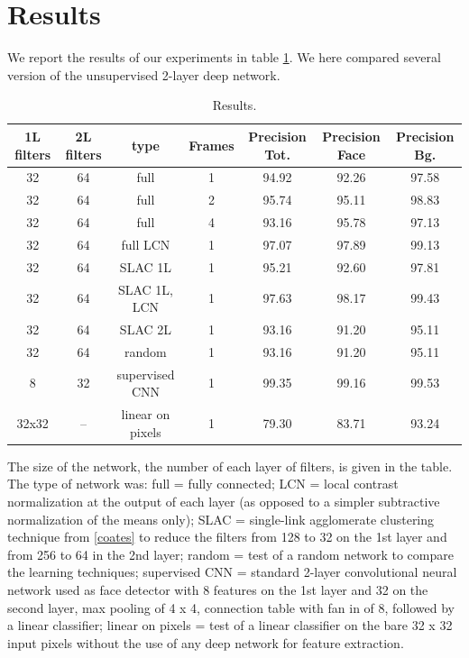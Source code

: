 \documentclass{article} %
\begin{document}



\section{Results}
\label{sec-results}


We report the results of our experiments in table \ref{table1}. We here compared several version of the unsupervised 2-layer deep network. 

\begin{table}[htdp]
\caption{Results.}
\begin{center}
\begin{tabular}{|c|c|c|c|c|c|c|}
\hline\hline
1L filters	& 2L filters	& type	& Frames	& Precision Tot. & Precision Face  & Precision Bg. \\ 
\hline
32 		& 64 		& full				& 1	& 94.92  	& 92.26	& 97.58  \\
32 		& 64 		& full				& 2	& 95.74	& 95.11	& 98.83  \\
32 		& 64 		& full				& 4	& 93.16  	& 95.78	& 97.13  \\
32 		& 64 		& full LCN			& 1	& 97.07 	& 97.89	& 99.13  \\ 
32 		& 64 		& SLAC 1L		& 1	& 95.21  	& 92.60	& 97.81  \\
32 		& 64 		& SLAC 1L, LCN	& 1	& 97.63 	& 98.17	& 99.43  \\ 
32 		& 64 		& SLAC 2L		& 1	& 93.16 	& 91.20	& 95.11  \\ 
32 		& 64 		& random			& 1	& 93.16 	& 91.20	& 95.11  \\ 
8 		& 32 		& supervised CNN	& 1	& 99.35 	& 99.16	& 99.53  \\ 
32x32 	& -- 		& linear on pixels	& 1	& 79.30 	& 83.71	& 93.24  \\ 
\hline\hline
\end{tabular}
\end{center}
\label{table1}
\end{table}


The size of the network, the number of each layer of filters,  is given in the table. The type of network was: full = fully connected; LCN = local contrast normalization at the output of each layer (as opposed to a simpler subtractive normalization of the means only); SLAC = single-link agglomerate clustering technique from \ref{coates} to reduce the filters from 128 to 32 on the 1st layer and from 256 to 64 in the 2nd layer; random = test of a random network to compare the learning techniques; supervised CNN = standard 2-layer convolutional neural network used as face detector with 8 features on the 1st layer and 32 on the second layer, max pooling of 4 x 4, connection table with fan in of 8, followed by a linear classifier; linear on pixels = test of a linear classifier on the bare 32 x 32 input pixels without the use of any deep network for feature extraction.
\end{document}
